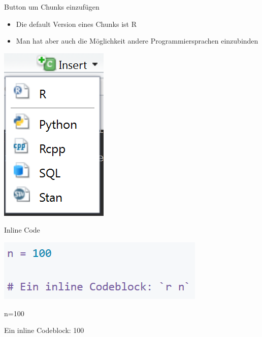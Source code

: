 \documentclass[ignorenonframetext,]{beamer}
\newenvironment{Shaded}{}{}
\newcommand{\DecValTok}[1]{\textcolor[rgb]{0.25,0.63,0.44}{{#1}}}
\newcommand{\NormalTok}[1]{{#1}}
\providecommand{\tightlist}{%
\setlength{\itemsep}{0pt}\setlength{\parskip}{0pt}}
\begin{document}
\begin{frame}{Button um Chunks einzufügen}

\begin{itemize}
\tightlist
\item
  Die default Version eines Chunks ist R
\item
  Man hat aber auch die Möglichkeit andere Programmiersprachen
  einzubinden
\end{itemize}

\includegraphics{./tex2pdf.956/0902c0c00b634dec607fe6bbda4246b93a04a77f.png}

\end{frame}

\begin{frame}[fragile]{Inline Code}

\includegraphics{./tex2pdf.956/ab6a014176cd5ec35bca9037d27a83e8e66fe337.png}

\begin{Shaded}
\begin{Highlighting}[]
\NormalTok{n=}\DecValTok{100}
\end{Highlighting}
\end{Shaded}

Ein inline Codeblock: 100

\end{frame}
\end{document}
